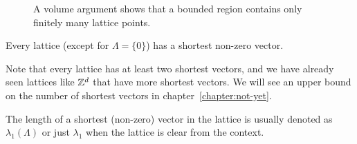 \begin{figure}
  \begin{center}
  \end{center}
  \caption{A volume argument shows that a bounded region contains only finitely many lattice points.}
  \label{fig:finitely-many-points-in-bounded-region}
\end{figure}

\begin{corollary}
  Every lattice (except for $\Lambda = \{ 0 \}$) has a shortest non-zero vector.
\end{corollary}

Note that every lattice has at least two shortest vectors,
and we have already seen lattices like $\mathbb{Z}^d$ that have more shortest vectors.
We will see an upper bound on the number of shortest vectors in chapter~\ref{chapter:not-yet}.

\begin{notation}
  The length of a shortest (non-zero) vector in the lattice is usually denoted as $\lambda_1(\Lambda)$
  or just $\lambda_1$ when the lattice is clear from the context.
\end{notation}



